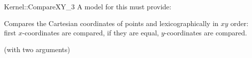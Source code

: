 \begin{ccRefFunctionObjectConcept}{Kernel::CompareXY_3}
A model for this must provide:


      {Compares the Cartesian coordinates of points  and
        lexicographically in $xy$ order: first 
       $x$-coordinates are compared, if they are equal, $y$-coordinates
       are compared.}

\ccRefines
{} (with two arguments)

\ccSeeAlso
{}  \\

\end{ccRefFunctionObjectConcept}
